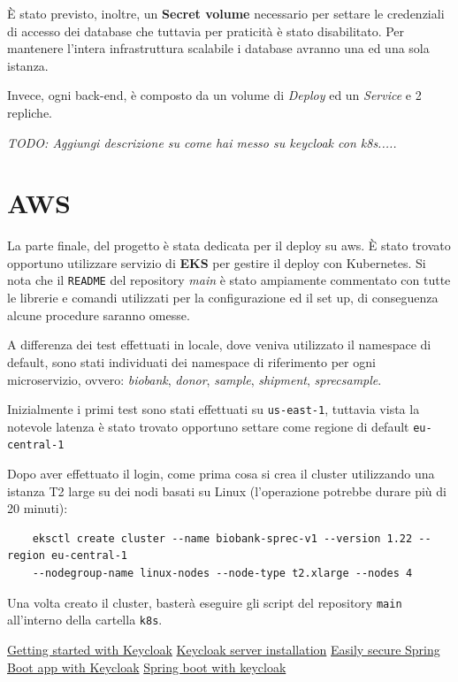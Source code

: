 \documentclass{article}
\begin{document}
È stato previsto, inoltre, un \textbf{Secret volume} necessario per settare le credenziali di accesso dei database che tuttavia per praticità è stato disabilitato. Per mantenere l'intera infrastruttura
scalabile i database avranno una ed una sola istanza.

Invece, ogni back-end, è composto da un volume di \textit{Deploy} ed un \textit{Service} e 2 repliche.

\textit{TODO: Aggiungi descrizione su come hai messo su keycloak con k8s.....}


\section{AWS}

La parte finale, del progetto è stata dedicata per il deploy su aws.
È stato trovato opportuno utilizzare servizio di \textbf{EKS} per gestire il deploy con Kubernetes. Si nota che il \texttt{README} del repository \textit{main} è stato ampiamente commentato con tutte le librerie e comandi 
utilizzati per la configurazione ed il set up, di conseguenza alcune procedure saranno omesse.

A differenza dei test effettuati in locale, dove veniva utilizzato il namespace di default, sono stati individuati dei namespace di riferimento per ogni microservizio,
ovvero: \textit{biobank}, \textit{donor}, \textit{sample}, \textit{shipment}, \textit{sprecsample}.  

Inizialmente i primi test sono stati effettuati su \texttt{us-east-1}, tuttavia vista la notevole latenza è stato trovato opportuno settare come regione di default \texttt{eu-central-1}

Dopo aver effettuato il login, come prima cosa si crea il cluster utilizzando una istanza T2 large su dei nodi basati su Linux (l'operazione potrebbe durare più di 20 minuti):

\begin{verbatim}
    eksctl create cluster --name biobank-sprec-v1 --version 1.22 -- region eu-central-1 
    --nodegroup-name linux-nodes --node-type t2.xlarge --nodes 4
\end{verbatim}

Una volta creato il cluster, basterà eseguire gli script del repository \texttt{main} all'interno della cartella \texttt{k8s}.




\pagebreak

\begin{thebibliography}{4}
     \href{https://www.keycloak.org/docs/11.0/getting_started/}{Getting started with Keycloak}
     \href{https://www.keycloak.org/docs/latest/server_installation/}{Keycloak server installation}
     \href{https://www.keycloak.org/2017/05/easily-secure-your-spring-boot.html}{Easily secure Spring Boot app with Keycloak}
     \href{https://www.baeldung.com/spring-boot-keycloak}{Spring boot with keycloak}

\end{thebibliography}
\end{document}
